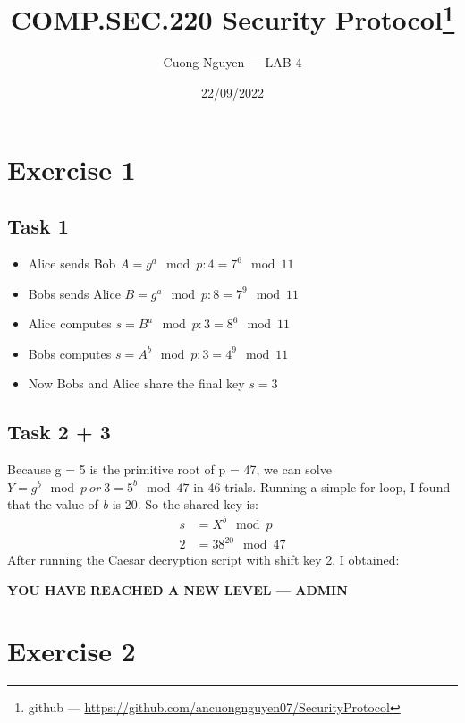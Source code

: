 \documentclass{article}
\title{COMP.SEC.220 Security Protocol\footnote{github --- \url{https://github.com/ancuongnguyen07/SecurityProtocol}}}
\author{Cuong Nguyen --- LAB 4}
\date{22/09/2022}
\begin{document}
    
\maketitle

\section*{Exercise 1}

\subsection*{Task 1}
%
\begin{itemize}
    \item Alice sends Bob \(A = g^{a} \mod p: 4 = 7^{6} \mod 11\)
    \item Bobs sends Alice \(B = g^{a} \mod p: 8 = 7^{9}  \mod 11\)
    \item Alice computes \(s = B^{a} \mod p: 3 = 8^{6} \mod 11\)
    \item Bobs computes \(s = A^{b} \mod p: 3 = 4^{9} \mod 11\)
    \item Now Bobs and Alice share the final key \(s = 3\)
\end{itemize}

\subsection*{Task 2 + 3}
%
Because g = 5 is the primitive root of p = 47, we can solve \(Y = g^{b}
\mod p\ or\ 3 = 5^{b} \mod 47\) in 46 trials. Running a simple for-loop,
I found that the value of \emph{b} is 20. So the shared key is:
\begin{align*}
    s &= X^{b} \mod p \\
    2 &= 38^{20} \mod 47
\end{align*}
After running the Caesar decryption script with shift key 2, I obtained:
\begin{center}
    \textbf{YOU HAVE REACHED A NEW LEVEL --- ADMIN}
\end{center}

\section*{Exercise 2}
%

\end{document}
